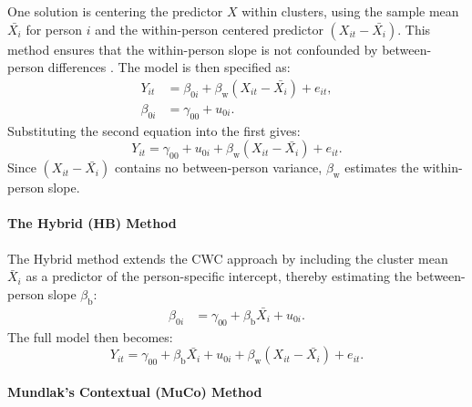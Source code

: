 \documentclass[stu]{apa7}
\begin{document}
One solution is centering the predictor $X$ within clusters, using the sample mean $\bar{X_i}$ for person $i$ and the within-person centered predictor $(X_{it} - \bar{X_i})$. This method ensures that the within-person slope is not confounded by between-person differences \parencite[e.g.,][]{hoffman_longitudinal_2015, kreft_effect_1995, raudenbush_hierarchical_2002}. The model is then specified as:
\begin{align}
Y_{it} &= \beta_{0i} + \beta_\text{w} (X_{it}- \bar{X_i}) + e_{it},  \\
\beta_{0i} &= \gamma_{00} + u_{0i}.
\end{align}
Substituting the second equation into the first gives:
\begin{equation}
\label{eqn:method-M2-linear}
Y_{it} = \gamma_{00} + u_{0i} + \beta_\text{w} (X_{it}- \bar{X_i}) + e_{it}.
\end{equation}
Since $(X_{it} - \bar{X_i})$ contains no between-person variance, $\beta_\text{w}$ estimates the within-person slope. 

\paragraph{The Hybrid (HB) Method}

The Hybrid method extends the CWC approach by including the cluster mean $\bar{X}_i$ as a predictor of the person-specific intercept, thereby estimating the between-person slope $\beta_{\text{b}}$:
\begin{align}
\beta_{0i} &= \gamma_{00} + \beta_\text{b} \bar{X_i} + u_{0i}.
\end{align}
The full model then becomes:
\begin{equation}
\label{eqn:method-M4-linear}
Y_{it} = \gamma_{00} + \beta_\text{b} \bar{X_i} + u_{0i} + \beta_\text{w} (X_{it} - \bar{X_i}) + e_{it}.
\end{equation}
\paragraph{Mundlak's Contextual (MuCo) Method}
\end{document}
